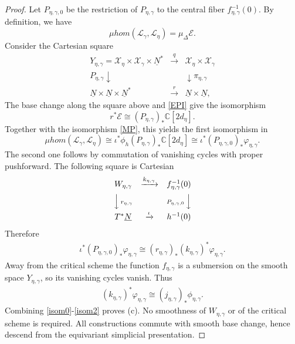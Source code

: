\documentclass[11pt,reqno]{amsart}
\theoremstyle{definition}
\theoremstyle{remark}
\def\bbC{\mathbb C}
\def\dN{\underline N}
\def\calE{\mathcal E}
\def\muhom{\mu hom}
\begin{document}
\begin{proof}
Let $P_{\eta,\gamma,0}$ be the restriction of $P_{\eta,\gamma}$ to the central fiber $f_{\eta,\gamma}^{-1}(0)$.
By definition, we have
$$\muhom(\mathscr L_\gamma,\mathscr L_\eta)=\mu_\Delta\calE.$$
Consider the Cartesian square
\[
\begin{array}{ccc}
Y_{\eta,\gamma}
=\mathscr X_\eta\times\mathscr X_\gamma\times\underline N^*
&\xrightarrow{\ q\ }&
\mathscr X_\eta\times\mathscr X_\gamma
\\[2mm]
{\scriptstyle P_{\eta,\gamma}}\downarrow
&&\downarrow{\scriptstyle\pi_{\eta,\gamma}}
\\[2mm]
\underline N\times\underline N\times\underline N^*
&\xrightarrow{\ r\ }&
\underline N\times\underline N ,
\end{array}
\]
 The base change along the square above and \eqref{EPI} give the isomorphism
$$r^*\calE\cong (P_{\eta,\gamma})_*\bbC[2d_\eta].$$
Together with the isomorphism \eqref{MP}, this yields the first isomorphism in
\begin{equation}\label{isom0}
 \muhom(\mathscr L_\gamma,\mathscr L_\eta)
 \cong\iota^*\phi_h(P_{\eta,\gamma})_*\bbC[2d_\eta]
 \cong\iota^*(P_{\eta,\gamma,0})_*\varphi_{\eta,\gamma}.
\end{equation}
The second one follows by commutation of vanishing cycles with proper pushforward.
The following square is Cartesian
\[
\begin{array}{ccc}
 W_{\eta,\gamma} & \xrightarrow{k_{\eta,\gamma}} & f_{\eta,\gamma}^{-1}(0)\\[2mm]
 \Big\downarrow\, {\scriptstyle r_{\eta,\gamma}} && {\scriptstyle P_{\eta,\gamma,0}}\,\Big\downarrow\\[2mm]
 T^*\dN & \xrightarrow{\iota} & h^{-1}(0)
\end{array}
\]
Therefore
\begin{align}\label{isom1}
 \iota^*(P_{\eta,\gamma,0})_*\varphi_{\eta,\gamma}
 \cong(r_{\eta,\gamma})_*(k_{\eta,\gamma})^*\varphi_{\eta,\gamma}.
\end{align}
Away from the critical scheme the function $f_{\eta,\gamma}$ is a submersion
on the smooth space $Y_{\eta,\gamma}$, so its vanishing cycles vanish.
Thus
\begin{align}\label{isom2}
 (k_{\eta,\gamma})^*\varphi_{\eta,\gamma}
 \cong(j_{\eta,\gamma})_*\phi_{\eta,\gamma}.
\end{align}
Combining \eqref{isom0}-\eqref{isom2} proves (c). No smoothness of
$W_{\eta,\gamma}$ or of the critical scheme is required.
All constructions commute with smooth base change, hence descend
from the equivariant simplicial presentation.
\end{proof}
\end{document}
